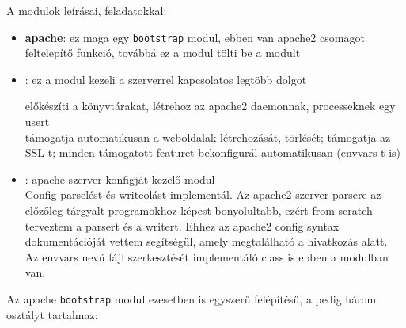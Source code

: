 A modulok leírásai, feladatokkal:
\begin{itemize}
	\item \textbf{apache}: ez maga egy \texttt{bootstrap} modul, ebben van apache2 csomagot feltelepítő funkció, továbbá ez a modul tölti be a \texttt{} modult
	\item \textbf{}: ez a modul kezeli a szerverrel kapcsolatos legtöbb dolgot
	
	előkészíti a könyvtárakat, létrehoz az apache2 daemonnak, processeknek egy usert\\támogatja automatikusan a weboldalak létrehozását, törlését; támogatja az SSL-t; minden támogatott featuret bekonfigurál automatikusan (envvars-t is)

	\item \textbf{}: apache szerver konfigját kezelő modul\\Config parselést és writeolást implementál. Az apache2 szerver parsere az előzőleg tárgyalt programokhoz képest bonyolultabb, ezért from scratch terveztem a parsert és a writert. Ehhez az apache2 config syntax dokumentációját vettem segítségül, amely megtalálható a \cite{apache_configuring} hivatkozás alatt.
	\\Az envvars nevű fájl szerkesztését implementáló class is ebben a modulban van.
\end{itemize}

\begin{center}
	Az apache \texttt{bootstrap} modul ezesetben is egyszerű felépítésű, a \texttt{} pedig három osztályt tartalmaz:
	
	\hfill
\end{center}
	
